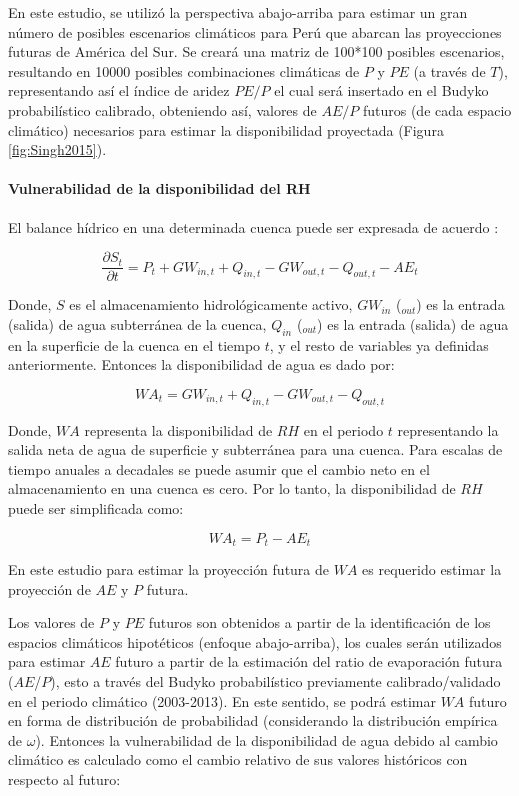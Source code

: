 \documentclass[12pt]{article}
\begin{document}
En este estudio, se utilizó la perspectiva abajo-arriba para estimar un gran número de posibles escenarios climáticos para Perú que abarcan las proyecciones futuras de América del Sur. Se creará una matriz de 100*100 posibles escenarios, resultando en 10000 posibles combinaciones climáticas de $P$ y $PE$ (a través de $T$), representando así el índice de aridez $PE/P$ el cual será insertado en el Budyko probabilístico calibrado, obteniendo así, valores de $AE/P$ futuros (de cada espacio climático) necesarios para estimar la disponibilidad proyectada (Figura \ref{fig:Singh2015}).

\paragraph{Vulnerabilidad de la disponibilidad del RH}\mbox{}

El balance hídrico en una determinada cuenca puede ser expresada de acuerdo \citep{Singh2015}:

\begin{equation}
\frac{\partial S_{t}}{\partial t} = P_{t} + GW_{in,t} + Q_{in,t} - GW_{out,t} - Q_{out,t} - AE_{t} 
\end{equation}

Donde, $S$ es el almacenamiento hidrológicamente activo, $GW_{in}$ ($_{out}$) es la entrada (salida) de agua subterránea de la cuenca, $Q_{in}$ ($_{out}$) es la entrada (salida) de agua en la superficie de la cuenca en el tiempo $t$, y el resto de variables ya definidas anteriormente. Entonces la disponibilidad de agua es dado por:

\begin{equation}
WA_{t} =  GW_{in,t} + Q_{in,t} - GW_{out,t} - Q_{out,t}
\end{equation}

Donde, $WA$ representa la disponibilidad de $RH$ en el periodo $t$ representando la salida neta de agua de superficie y subterránea para una cuenca. Para escalas de tiempo anuales a decadales se puede asumir que el cambio neto en el almacenamiento en una cuenca es cero. Por lo tanto, la disponibilidad de $RH$ puede ser simplificada como: 

\begin{equation}
WA_{t} = P_{t} - AE_{t}
\end{equation}

En este estudio para estimar la proyección futura de $WA$ es requerido estimar la proyección de $AE$ y $P$ futura.

Los valores de $P$ y $PE$ futuros son obtenidos a partir de la identificación de los espacios climáticos hipotéticos (enfoque abajo-arriba), los cuales serán utilizados para estimar $AE$ futuro a partir de la estimación del ratio de evaporación futura ($AE$/$P$), esto a través del Budyko probabilístico previamente calibrado/validado en el periodo climático (2003-2013). En este sentido, se podrá estimar $WA$ futuro en forma de distribución de probabilidad (considerando la distribución empírica de $\omega$). Entonces la vulnerabilidad de la disponibilidad de agua debido al cambio climático es calculado como el cambio relativo de sus valores históricos con respecto al futuro:
\end{document}

